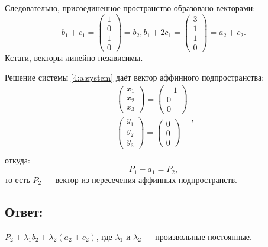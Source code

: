 \documentclass[12pt]{article}
\begin{document}
    Следовательно, присоединенное пространство образовано векторами:
    \[
        b_1 + c_1 =
        \begin{pmatrix}
            1 \\ 0 \\ 1 \\ 0
        \end{pmatrix}
        = b_2,
        b_1 + 2 c_1 =
        \begin{pmatrix}
            3 \\ 1 \\ 1 \\ 0
        \end{pmatrix}
        = a_2 + c_2 .
    \]
    Кстати, векторы линейно-независимы.

    Решение системы \eqref{4:a:system} даёт вектор аффинного подпространства:
    \[
        \begin{array}{c}
            \begin{pmatrix}
                x_1 \\ x_2 \\ x_3
            \end{pmatrix}
            =
            \begin{pmatrix}
                -1 \\ 0 \\ 0
            \end{pmatrix}             \\
            \begin{pmatrix}
                y_1 \\ y_2 \\ y_3
            \end{pmatrix}
            =
            \begin{pmatrix}
                0 \\ 0 \\ 0
            \end{pmatrix} \\
        \end{array} ,
    \]
    откуда:
    \[
        P_1 - a_1 = P_2 ,
    \]
    то есть $P_2$ --- вектор из пересечения аффинных подпространств.

    \subsection*{Ответ:}
    $P_2 + \lambda_1 b_2 + \lambda_2 \left ( a_2 + c_2 \right )$, где $\lambda_1$ и $\lambda_2$ --- произвольные постоянные.
\end{document}
